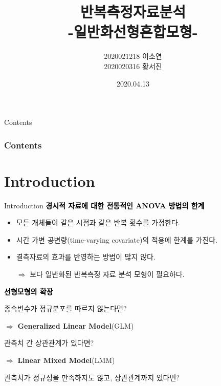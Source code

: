 \documentclass[9pt, xelatex]{beamer}
\title[Short title]{반복측정자료분석 \\
	{\small -일반화선형혼합모형- }
	} %
\author{2020021218 이소연 \\2020020316 황서진}
\institute[]{\small 고려대학교 통계학과} %
\date{2020.04.13} %
\begin{document}
\begin{frame}
\titlepage %
\end{frame}

\begin{frame}{Contents}
\frametitle{Contents}
\tableofcontents 
\end{frame}


\section{Introduction}{
	\begin{frame}[allowframebreaks]{Introduction}
		\textcolor{black}{\textbf{경시적 자료에 대한 전통적인 ANOVA 방법의 한계}}
		\vspace{5mm}
		
		\begin{itemize}
			\item 모든 개체들이 같은 시점과 같은 반복 횟수를 가정한다.
			\item 시간 가변 공변량(time-varying covariate)의 적용에 한계를 가진다.
			\item 결측자료의 효과를 반영하는 방법이 많지 않다.
			\vspace{5mm}
			
			$\Longrightarrow$ 보다 일반화된 반복측정 자료 분석 모형이 필요하다.
		\end{itemize}
		
		\framebreak
		\textcolor{black}{\textbf{선형모형의 확장}}
		\vspace{5mm}
		
		종속변수가 정규분포를 따르지 않는다면?
		\vspace{2mm}
		
		$\Longrightarrow$ \textbf{Generalized Linear Model}(GLM)
		\vspace{5mm}
		
		관측치 간 상관관계가 있다면?
		\vspace{2mm}
		
		$\Longrightarrow$ \textbf{Linear Mixed Model}(LMM)
		\vspace{5mm}
		
		관측치가 정규성을 만족하지도 않고, 상관관계까지 있다면?
		\vspace{2mm}
		

\end{frame}}
\end{document}
